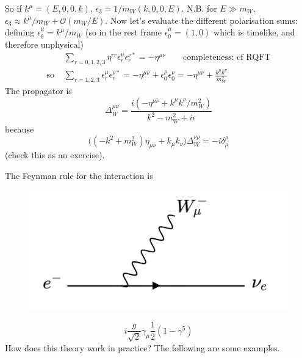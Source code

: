 \documentclass[a4paper,12pt]{article}
\begin{document}
So if $k^\mu = (E, 0, 0, k)$, $\epsilon_3 = 1/m_W(k,0,0,E)$. N.B. for $E \gg m_W$, $\epsilon_3 \approx k^\mu/m_W + \mathcal{O}(m_W/E)$. Now let's evaluate the different polarisation sums: defining $\epsilon_0^\mu = k^\mu/m_W$ (so in the rest frame $\epsilon_0^\mu = (1, \underline{0})$ which is timelike, and therefore unphysical)
\begin{equation}
\begin{split}
&\sum_{r=0,1,2,3}\eta^{rr}\epsilon_r^\mu \epsilon_r^{\nu *} = - \eta^{\mu \nu} \qquad \text{completeness: cf RQFT} \\
\text{so } &\sum_{r=1,2,3}\epsilon^\mu_r \epsilon_r^{\nu *} = -\eta^{\mu \nu} + \epsilon_0^\mu \epsilon_0^\nu = -\eta^{\mu\nu} + \frac{k^\mu k^\nu}{m_W^2}
\end{split}
\end{equation}
The propagator is 
\begin{equation}
\Delta^{\mu\nu}_W = \frac{i(-\eta^{\mu \nu} + k^\mu k^\nu/m_W^2)}{k^2-m_W^2 + i\epsilon}
\end{equation}
because
\begin{equation}
\big((-k^2 + m_W^2)\eta_{\mu\nu} + k_\mu k_\nu)\Delta^{\nu \rho}_W = -i\delta_\mu^\rho
\end{equation}
(check this as an exercise).

The Feynman rule for the interaction is
\newline
\begin{figure}
  \centering
  \includegraphics[width=\linewidth]{figs/17a.png}
\end{figure}
\begin{equation}
i\frac{g}{\sqrt{2}}\gamma_\mu\frac{1}{2}(1-\gamma^5)
\end{equation}
How does this theory work in practice? The following are some examples.
\newline
\newline
\end{document}
